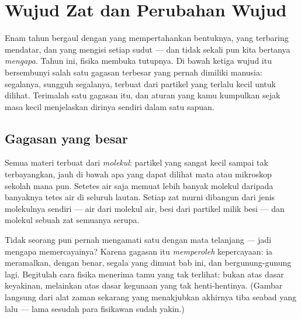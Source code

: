 \chapter{Wujud Zat dan Perubahan Wujud}\label{ch:g7:states-of-matter}

Enam tahun bergaul dengan  yang mempertahankan bentuknya,  yang terbaring mendatar, dan  yang mengisi setiap sudut ---
dan tidak sekali pun kita bertanya \emph{mengapa}. Tahun ini, fisika
membuka tutupnya. Di bawah ketiga wujud itu bersembunyi salah satu
gagasan terbesar yang pernah dimiliki manusia: segalanya, sungguh
segalanya, terbuat dari partikel yang terlalu kecil untuk dilihat.
Terimalah satu gagasan itu, dan aturan yang kamu kumpulkan sejak masa
kecil menjelaskan dirinya sendiri dalam satu sapuan.

\section{Gagasan yang besar}

\begin{definition}[Molekul]\label{def:g7:states-of-matter:molecule}
Semua materi terbuat dari \emph{molekul}: partikel yang
sangat kecil sampai tak terbayangkan, jauh di bawah apa yang dapat
dilihat mata atau mikroskop sekolah mana pun. Setetes air saja memuat
lebih banyak molekul daripada banyaknya tetes air di seluruh lautan.
Setiap zat murni dibangun dari jenis molekulnya sendiri --- air dari
molekul air, besi dari partikel milik besi --- dan molekul sebuah zat
semuanya serupa.
\end{definition}

\begin{remark}\label{rem:g7:states-of-matter:believing}
Tidak seorang pun pernah mengamati satu  dengan mata telanjang
--- jadi mengapa memercayainya? Karena gagasan itu \emph{memperoleh}
kepercayaan: ia meramalkan, dengan benar, segala yang dimuat bab ini,
dan bergunung-gunung lagi. Begitulah cara fisika menerima tamu yang
tak terlihat: bukan atas dasar keyakinan, melainkan atas dasar
kegunaan yang tak henti-hentinya. (Gambar langsung dari alat zaman
sekarang yang menakjubkan akhirnya tiba seabad yang lalu --- lama
sesudah para fisikawan sudah yakin.)
\end{remark}


